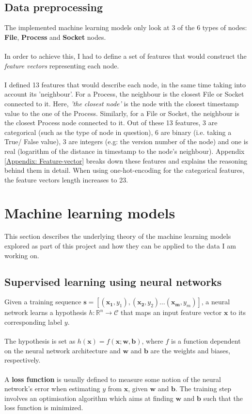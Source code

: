 	\subsection{Data preprocessing} \label{Section: prep/data/feature-vectors}
	The implemented machine learning models only look at 3 of the 6 types of nodes: \textbf{File}, \textbf{Process} and \textbf{Socket} nodes. 
	\\ \\
	In order to achieve this, I had to define a set of features that would construct the \textit{feature vectors} representing each node. 
	\\ \\
	I defined 13 features that would describe each node, in the same time taking into account its 'neighbour'. For a Process, the neighbour is the closest File or Socket connected to it. Here, \textit{'the closest node'} is the node with the closest timestamp value to the one of the Process. Similarly, for a File or Socket, the neighbour is the closest Process node connected to it. Out of these 13 features, 3 are categorical (such as the type of node in question), 6 are binary (i.e. taking a True/ False value), 3 are integers (e.g: the version number of the node) and one is real (logarithm of the distance in timestamp to the node's neighbour). Appendix \ref{Appendix: Feature-vector} breaks down these features and explains the reasoning behind them in detail. When using one-hot-encoding for the categorical features, the feature vectors length increases to 23.

	\section{Machine learning models} \label{Section 2.2}
	This section describes the underlying theory of the machine learning models explored as part of this project and how they can be applied to the data I am working on.

	\subsection{Supervised learning using neural networks} \label{Section 2.2.2}
	Given a training sequence $\mathbf{s} = [(\mathbf{x_1}, y_1), (\mathbf{x_2}, y_2) \dots (\mathbf{x_m}, y_m)]$, a neural network learns a hypothesis $h: \mathbb{R}^n \rightarrow \mathcal{C}$ that maps an input feature vector $\mathbf{x}$ to its corresponding label $y$. 
	\\ \\ 
	The hypothesis is set as $h(\mathbf{x}) = f(\mathbf{x}; \mathbf{w}, \mathbf{b})$, where $f$ is a function dependent on the neural network architecture and $\mathbf{w}$ and $\mathbf{b}$ are the weights and biases, respectively. 
	\\ \\
	A \textbf{loss function} is usually defined to measure some notion of the neural network's error when estimating $y$ from $\mathbf{x}$, given $\mathbf{w}$ and $\mathbf{b}$. The training step involves an optimisation algorithm which aims at finding $\mathbf{w}$ and $\mathbf{b}$ such that the loss function is minimized. 
	
